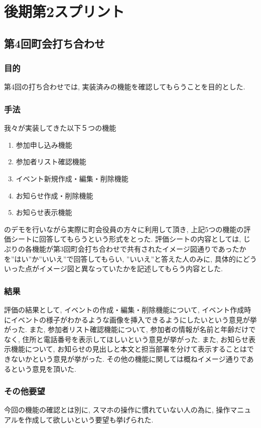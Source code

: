 \section{後期第2スプリント}
\subsection{第4回町会打ち合わせ}
\subsubsection{目的}
第4回の打ち合わせでは, 実装済みの機能を確認してもらうことを目的とした.
\subsubsection{手法}
我々が実装してきた以下５つの機能
\begin{enumerate}
    \item 参加申し込み機能
    \item 参加者リスト確認機能
    \item イベント新規作成・編集・削除機能
    \item お知らせ作成・削除機能
    \item お知らせ表示機能
\end{enumerate}
のデモを行いながら実際に町会役員の方々に利用して頂き, 上記5つの機能の評価シートに回答してもらうという形式をとった.
評価シートの内容としては, じぷりの各機能が第3回町会打ち合わせで共有されたイメージ図通りであったかを”はい”か”いいえ”で回答してもらい,
”いいえ”と答えた人のみに, 具体的にどういった点がイメージ図と異なっていたかを記述してもらう内容とした.
\subsubsection{結果}
評価の結果として, イベントの作成・編集・削除機能について, イベント作成時にイベントの様子がわかるような画像を挿入できるようにしたいという意見が挙がった.
また, 参加者リスト確認機能について, 参加者の情報が名前と年齢だけでなく, 住所と電話番号を表示してほしいという意見が挙がった.
また, お知らせ表示機能について, お知らせの見出しと本文と担当部署を分けて表示することはできないかという意見が挙がった.
その他の機能に関しては概ねイメージ通りであるという意見を頂いた.
\subsubsection{その他要望}
今回の機能の確認とは別に, スマホの操作に慣れていない人の為に, 操作マニュアルを作成して欲しいという要望も挙げられた.

